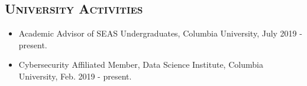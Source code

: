 \documentclass[10pt]{article}
\renewcommand{\section}[1]{
	\vspace{-5pt}
   	\subsection*{\scshape  \bfseries #1}
   }
\newenvironment{innerlist}[1][\enskip\textbullet]%
        {\begin{itemize}[#1,leftmargin=25pt,parsep=0pt,itemsep=2pt,topsep=2pt,partopsep=0pt]}
        {\end{itemize}}
\newcommand{\halfblankline}{\quad\vspace{-0.5\baselineskip}\pagebreak[3]}
\providecommand\Matlab{\textsc{Matlab}}
\begin{document}
\section{University Activities}
\begin{innerlist}

\item[] Academic Advisor of SEAS Undergraduates, {Columbia University}, July 2019 - present.


\vspace{0.05in}
 
\item[] Cybersecurity Affiliated Member, {Data Science Institute}, {Columbia University}, Feb. 2019 - present.


\end{innerlist}

%
%
%
%
%
%
%
%
%
%

%


\begin{comment}
Computer Programming:
%
\begin{innerlist}
    \item C, C$+$$+$, Java, JavaScript, NetLogo, Pascal, Perl, PHP,
        Lisp, UNIX shell scripting (including POSIX.2), GNU make,
        AppleScript, SQL, MySQL, \Matlab, Maple, Mathematica, and others
\end{innerlist}

\halfblankline
\end{comment}
\end{document}
